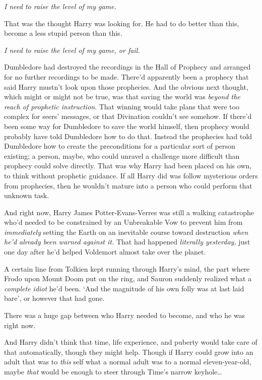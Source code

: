 \emph{I need to raise the level of my game.}

That was the thought Harry was looking for. He had to do better than this,
become a less stupid person than this.

\emph{I need to raise the level of my game, or fail.}

Dumbledore had destroyed the recordings in the Hall of Prophecy and arranged
for no further recordings to be made. There'd apparently been a prophecy that
said Harry mustn't look upon those prophecies. And the obvious next thought,
which might or might not be true, was that saving the world was \emph{beyond
the reach of prophetic instruction}. That winning would take plans that were
too complex for seers' messages, or that Divination couldn't see somehow. If
there'd been some way for Dumbledore to save the world himself, then prophecy
would probably have told Dumbledore how to do that. Instead the prophecies had
told Dumbledore how to create the preconditions for a particular sort of person
existing; a person, maybe, who could unravel a challenge more difficult than
prophecy could solve directly. That was why Harry had been placed on his own,
to think without prophetic guidance. If all Harry did was follow mysterious
orders from prophecies, then he wouldn't mature into a person who could perform
that unknown task.

And right now, Harry James Potter-Evans-Verres was still a walking catastrophe
who'd needed to be constrained by an Unbreakable Vow to prevent him from
\emph{immediately} setting the Earth on an inevitable course toward destruction
\emph{when he'd already been warned against it.} That had happened
\emph{literally yesterday,} just one day after he'd helped Voldemort almost
take over the planet.

A certain line from Tolkien kept running through Harry's mind, the part where
Frodo upon Mount Doom put on the ring, and Sauron suddenly realized what a
\emph{complete idiot} he'd been. `And the magnitude of his own folly was at
last laid bare', or however that had gone.

There was a huge gap between who Harry needed to become, and who he was right
now.

And Harry didn't think that time, life experience, and puberty would take care
of that automatically, though they might help. Though if Harry could grow into
an adult that was to \emph{this} self what a normal adult was to a normal
eleven-year-old, maybe \emph{that} would be enough to steer through Time's
narrow keyhole{\ldots}


